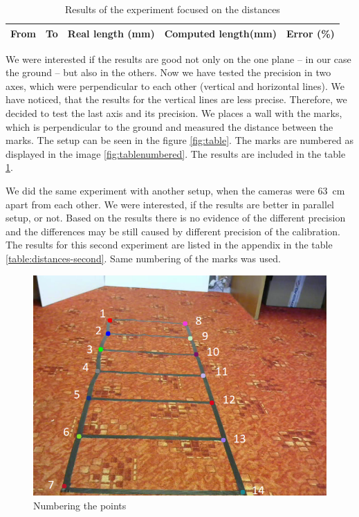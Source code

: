 \begin{table}
\centering
\begin{tabular}{|r|r|r|r|r|}
\hline
From	& To	& Real length (mm) & Computed length(mm) & Error (\%) \\
\hline
\hline

\hline
\end{tabular}
\caption{Results of the experiment focused on the distances}
\label{table:distances}
\end{table}

We were interested if the results are good not only on the one plane -- in our
case the ground -- but also in the others. Now we have tested the precision in
two axes, which were perpendicular to each other (vertical and horizontal
lines). We have noticed, that the results for the vertical lines are less
precise. Therefore, we decided to test the last axis and its precision. We places
a wall with the marks, which is perpendicular to the ground and measured the
distance between the marks. The setup can be seen in the figure
\ref{fig:table}. The marks are numbered as displayed in the image
\ref{fig:tablenumbered}. The results are included in the table
\ref{table:distances}. 

We did the same experiment with another setup, when the cameras were 63~cm
apart from each other. We were interested, if the results are better in
parallel setup, or not. Based on the results there is no evidence of the
different precision and the differences may be still caused by different
precision of the calibration. The results for this second experiment are listed
in the appendix in the table \ref{table:distances-second}. Same numbering of
the marks was used.

\begin{figure}
\centering
\includegraphics[width=0.8\linewidth]{img/experiments/right-ladder-numbered.png}
\caption{Numbering the points}
\label{fig:ladder_numbered}
\end{figure}


